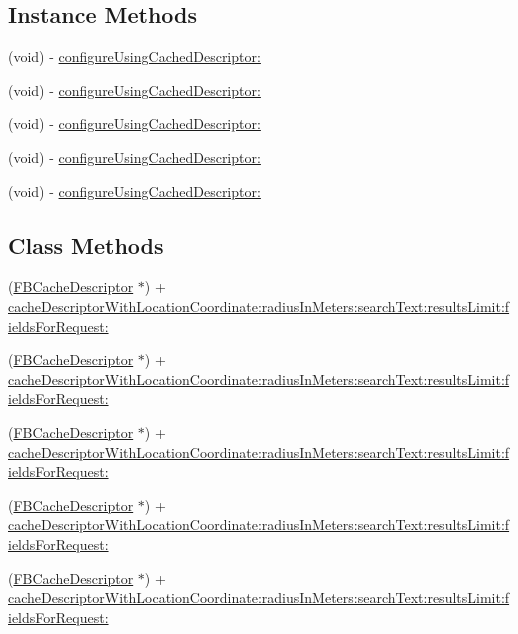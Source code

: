 \subsection*{Instance Methods}
\begin{DoxyCompactItemize}
\item 
(void) -\/ \hyperlink{interfaceFBPlacePickerViewController_a9822a782d9902415bcf142f4dc8f2c11}{configure\+Using\+Cached\+Descriptor\+:}
\item 
(void) -\/ \hyperlink{interfaceFBPlacePickerViewController_a9822a782d9902415bcf142f4dc8f2c11}{configure\+Using\+Cached\+Descriptor\+:}
\item 
(void) -\/ \hyperlink{interfaceFBPlacePickerViewController_a9822a782d9902415bcf142f4dc8f2c11}{configure\+Using\+Cached\+Descriptor\+:}
\item 
(void) -\/ \hyperlink{interfaceFBPlacePickerViewController_a9822a782d9902415bcf142f4dc8f2c11}{configure\+Using\+Cached\+Descriptor\+:}
\item 
(void) -\/ \hyperlink{interfaceFBPlacePickerViewController_a9822a782d9902415bcf142f4dc8f2c11}{configure\+Using\+Cached\+Descriptor\+:}
\end{DoxyCompactItemize}
\subsection*{Class Methods}
\begin{DoxyCompactItemize}
\item 
(\hyperlink{interfaceFBCacheDescriptor}{F\+B\+Cache\+Descriptor} $\ast$) + \hyperlink{interfaceFBPlacePickerViewController_ab8216b73fcd5d1bea32fc317d38e05ce}{cache\+Descriptor\+With\+Location\+Coordinate\+:radius\+In\+Meters\+:search\+Text\+:results\+Limit\+:fields\+For\+Request\+:}
\item 
(\hyperlink{interfaceFBCacheDescriptor}{F\+B\+Cache\+Descriptor} $\ast$) + \hyperlink{interfaceFBPlacePickerViewController_ab8216b73fcd5d1bea32fc317d38e05ce}{cache\+Descriptor\+With\+Location\+Coordinate\+:radius\+In\+Meters\+:search\+Text\+:results\+Limit\+:fields\+For\+Request\+:}
\item 
(\hyperlink{interfaceFBCacheDescriptor}{F\+B\+Cache\+Descriptor} $\ast$) + \hyperlink{interfaceFBPlacePickerViewController_ab8216b73fcd5d1bea32fc317d38e05ce}{cache\+Descriptor\+With\+Location\+Coordinate\+:radius\+In\+Meters\+:search\+Text\+:results\+Limit\+:fields\+For\+Request\+:}
\item 
(\hyperlink{interfaceFBCacheDescriptor}{F\+B\+Cache\+Descriptor} $\ast$) + \hyperlink{interfaceFBPlacePickerViewController_ab8216b73fcd5d1bea32fc317d38e05ce}{cache\+Descriptor\+With\+Location\+Coordinate\+:radius\+In\+Meters\+:search\+Text\+:results\+Limit\+:fields\+For\+Request\+:}
\item 
(\hyperlink{interfaceFBCacheDescriptor}{F\+B\+Cache\+Descriptor} $\ast$) + \hyperlink{interfaceFBPlacePickerViewController_ab8216b73fcd5d1bea32fc317d38e05ce}{cache\+Descriptor\+With\+Location\+Coordinate\+:radius\+In\+Meters\+:search\+Text\+:results\+Limit\+:fields\+For\+Request\+:}
\end{DoxyCompactItemize}
